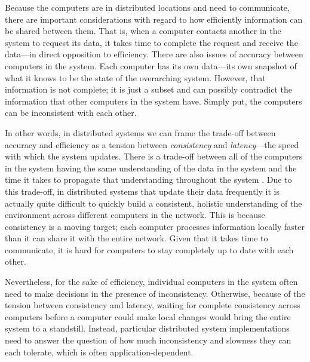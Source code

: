\documentclass[sigplan,screen]{acmart}
\begin{document}
Because the computers are in distributed locations and need to communicate, there are important considerations with regard to how efficiently information can be shared between them. That is, when a computer contacts another in the system to request its data, it takes time to complete the request and receive the data---in direct opposition to efficiency. There are also issues of accuracy between computers in the system. Each computer has its own data---its own snapshot of what it knows to be the state of the overarching system. However, that information is not complete; it is just a subset and can possibly contradict the information that other computers in the system have. Simply put, the computers can be inconsistent with each other.

In other words, in distributed systems we can frame the trade-off between accuracy and efficiency as a tension between \emph{consistency} and \emph{latency}---the speed with which the system updates. There is a trade-off between all of the computers in the system having the same understanding of the data in the system and the time it takes to propagate that understanding throughout the system \cite{Abadi2012tradeoff, Brewer12computer}. Due to this trade-off, in distributed systems that update their data frequently it is actually quite difficult to quickly build a consistent, holistic understanding of the environment across different computers in the network. This is because consistency is a moving target; each computer processes information locally faster than it can share it with the entire network. Given that it takes time to communicate, it is hard for computers to stay completely up to date with each other.

Nevertheless, for the sake of efficiency, individual computers in the system often need to make decisions in the presence of inconsistency. Otherwise, because of the tension between consistency and latency, waiting for complete consistency across computers before a computer could make local changes would bring the entire system to a standstill. Instead, particular distributed system implementations need to answer the question of how much inconsistency and slowness they can each tolerate, which is often application-dependent.
\end{document}
